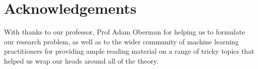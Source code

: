 
\begingroup
\let\clearpage\relax
\let\cleardoublepage\relax
\let\cleardoublepage\relax

\chapter*{Acknowledgements}

With thanks to our professor, Prof Adam Oberman for helping us to formulate our research problem, as well as to the wider community of machine learning practitioners for providing ample reading material on a range of tricky topics that helped us wrap our heads around all of the theory.

\endgroup
